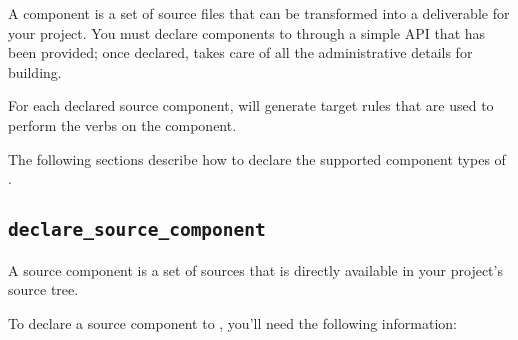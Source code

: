 A component is a set of source files that can be transformed into a
deliverable for your project.  You must declare components to \lmsbw
through a simple API that has been provided; once declared, \lmsbw
takes care of all the administrative details for building.

For each declared source component, \lmsbw will generate target
\makefile rules that are used to perform the \lmsbw verbs on the
component.

The following sections describe how to declare the supported
component types of \lmsbw.

\subsection{\texttt{declare\_source\_component}}

A source component is a set of sources that is directly available in
your project's source tree.

To declare a source component to \lmsbw, you'll need the following
information:

